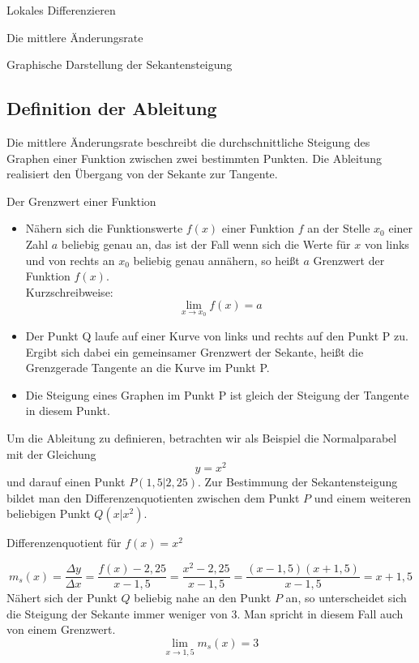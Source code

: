 \begin{section}{Lokales Differenzieren}
\begin{subsection}{Die mittlere Änderungsrate}
\begin{bsp}{Graphische Darstellung der Sekantensteigung}{}
\begin{center}
\end{center}
\end{bsp}
\end{subsection}
\subsection{Definition der Ableitung}
Die mittlere Änderungsrate beschreibt die durchschnittliche Steigung des Graphen einer Funktion zwischen zwei bestimmten Punkten. Die Ableitung realisiert den Übergang von der Sekante zur Tangente.
\begin{merke}{Der Grenzwert einer Funktion}{}
\begin{itemize}
 \item Nähern sich die Funktionswerte $f(x)$ einer Funktion $f$ an der Stelle $x_0$ einer Zahl $a$ beliebig genau an, das ist der Fall wenn sich die Werte für $x$ von links und von rechts an $x_0$ beliebig genau annähern, so heißt $a$ Grenzwert der Funktion $f(x)$. \\Kurzschreibweise: $$\lim_{x \rightarrow x_0} f(x)= a$$ 
 \item Der Punkt Q laufe auf einer Kurve von links und rechts auf den Punkt P zu. Ergibt sich dabei ein gemeinsamer Grenzwert der Sekante, heißt die Grenzgerade Tangente an die Kurve im Punkt P.
 \item Die Steigung eines Graphen im Punkt P ist gleich der Steigung der Tangente in diesem Punkt.
\end{itemize}
\end{merke}
Um die Ableitung zu definieren, betrachten wir als Beispiel die Normalparabel mit der Gleichung $$ y=x^2 $$ und darauf einen Punkt $P(1,5|2,25)$. Zur Bestimmung der Sekantensteigung bildet man den Differenzenquotienten zwischen dem Punkt $P$ und einem weiteren beliebigen Punkt $Q(x|x^2)$. 
\begin{bem*}{Differenzenquotient für $f(x) =x^2 $}
  
  $$ m_s(x)= \dfrac{\Delta y}{\Delta x} = \dfrac{f(x) - 2,25}{x - 1,5} = \dfrac{x^2 - 2,25}{x- 1,5} = \dfrac{(x-1,5)(x+1,5)}{x-1,5} =x+1,5 $$
Nähert sich der Punkt $Q$ beliebig nahe an den Punkt $P$ an, so unterscheidet sich die Steigung der Sekante immer weniger von 3. Man spricht in diesem Fall auch von einem Grenzwert.
$$\lim_{x\rightarrow 1,5} m_s(x) = 3$$
\end{bem*}


\end{section}
